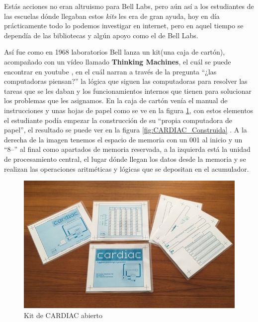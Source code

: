 \documentclass[letterpaper,12pt,oneside]{book}
\begin{document}
		
		Estás acciones no eran altruismo para Bell Labs, pero aún así a los estudiantes de las 
		escuelas dónde
		llegaban estos \textit{kits} les era de gran ayuda, hoy en día prácticamente todo lo podemos investigar en internet, pero en aquel tiempo se dependía de las
		bibliotecas y algún apoyo como el de Bell Labs.
		
		Así fue como en 1968 laboratorios Bell lanza un kit(una caja de cartón), acompañado con un vídeo llamado \textbf{Thinking Machines}, el
		cuál se puede encontrar en youtube \cite{att_tech_channel_att_2012}, en el cuál narran
		a través de la pregunta ``¿las computadoras piensan?'' la lógica que siguen las computadoras para resolver las tareas que se les daban y los funcionamientos
		internos que tienen para solucionar los problemas que les asignamos. En la caja de cartón venía el manual de instrucciones 
		\cite{hegelbarger_instruction_1968} y unas hojas de papel como se ve en la figura \ref{fig:Kit_CARDIAC}, con estos elementos el 
		estudiante podía empezar la construcción de su ``propia computadora de papel'', el resultado se puede ver en la figura \ref{fig:CARDIAC_Construida} 
		\cite{megardi_cardiac_nodate}.
		A la derecha de la imagen tenemos el espacio de memoria con un 001 al inicio y un ``8--'' al final como apartados de memoria reservada, a la izquierda
		está la unidad de procesamiento central, el lugar dónde llegan los datos desde la memoria y se realizan las operaciones aritméticas y lógicas
		que se depositan en el acumulador.
		
		\begin{figure}[h]
		\centering
			\includegraphics[scale=0.3]{media/CARDIAC_Paper/paper1.jpg}
			\caption{Kit de CARDIAC abierto}
			\label{fig:Kit_CARDIAC}%
		\end{figure}
		
\end{document}
